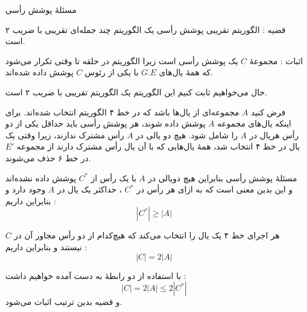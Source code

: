\begin{itemframe}{‌مسئلهٔ پوشش رأسی}
\item[\textbullet]
قضیه : الگوریتم تقریبی پوشش رأسی یک الگوریتم چند جمله‌ای تقریبی با ضریب ۲ است.
\item[\textbullet]
اثبات : مجموعهٔ
$C$
یک پوشش رأسی است زیرا الگوریتم در حلقه تا وقتی تکرار می‌شود که همهٔ یال‌های
$G.E$
با یکی از رئوس
$C$
پوشش داده شده‌اند.
\item[\textbullet]
حال می‌خواهیم ثابت کنیم این الگوریتم یک الگوریتم تقریبی با ضریب ۲ است.
\item[\textbullet]
فرض کنید
$A$
مجموعه‌ای از یال‌ها باشد که در خط ۴ الگوریتم انتخاب شده‌اند. برای اینکه یال‌های مجموعه
$A$
پوشش داده شوند، هر پوشش رأسی باید حداقل یکی از دو رأس هریال در
$A$
را شامل شود. هیچ دو یالی در
$A$
رأس مشترک ندارند، زیرا وقتی یک یال در خط ۴ انتخاب شد، همهٔ یال‌هایی که با آن یال رأس مشترک دارند از مجموعه
$E'$
در خط ۶ حذف می‌شوند.
\end{itemframe}


\begin{itemframe}{‌مسئلهٔ پوشش رأسی}
\itm
بنابراین هیچ دویالی در
$A$
با یک رأس از
$C^*$
پوشش داده نشده‌اند و این بدین معنی است که به ازای هر رأس در
$C^*$
، حداکثر یک یال در
$A$
وجود دارد و بنابراین داریم :
$$
|C^*| \geqslant |A|
$$

\itm

هر اجرای خط ۴ یک یال را انتخاب می‌کند که هیچ‌کدام از دو رأس مجاور آن در
$C$
نیستند و بنابراین داریم :
$$
|C| = 2 |A|
$$
\itm

با استفاده از دو رابطهٔ به دست آمده خواهیم داشت :
$$
|C| = 2 |A| \leqslant 2|C^*|
$$
و قضیه بدین ترتیب اثبات می‌شود.

\end{itemframe}
